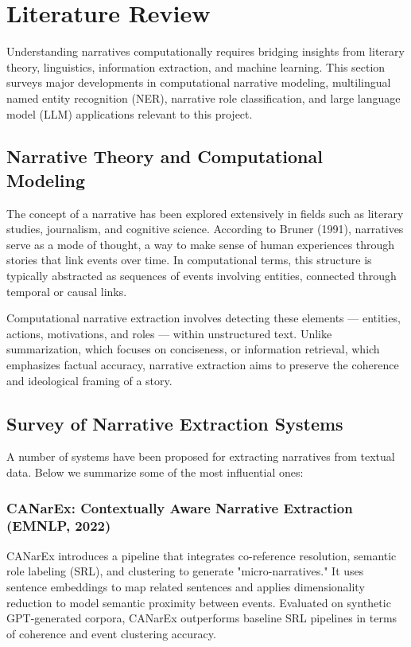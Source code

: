 \documentclass[12pt]{article}
\begin{document}
\section{Literature Review}

Understanding narratives computationally requires bridging insights from literary theory, linguistics, information extraction, and machine learning. This section surveys major developments in computational narrative modeling, multilingual named entity recognition (NER), narrative role classification, and large language model (LLM) applications relevant to this project.

\subsection{Narrative Theory and Computational Modeling}

The concept of a narrative has been explored extensively in fields such as literary studies, journalism, and cognitive science. According to Bruner (1991), narratives serve as a mode of thought, a way to make sense of human experiences through stories that link events over time. In computational terms, this structure is typically abstracted as sequences of events involving entities, connected through temporal or causal links.

Computational narrative extraction involves detecting these elements — entities, actions, motivations, and roles — within unstructured text. Unlike summarization, which focuses on conciseness, or information retrieval, which emphasizes factual accuracy, narrative extraction aims to preserve the coherence and ideological framing of a story.

\subsection{Survey of Narrative Extraction Systems}

A number of systems have been proposed for extracting narratives from textual data. Below we summarize some of the most influential ones:

\subsubsection{CANarEx: Contextually Aware Narrative Extraction (EMNLP, 2022)}

CANarEx introduces a pipeline that integrates co-reference resolution, semantic role labeling (SRL), and clustering to generate "micro-narratives." It uses sentence embeddings to map related sentences and applies dimensionality reduction to model semantic proximity between events. Evaluated on synthetic GPT-generated corpora, CANarEx outperforms baseline SRL pipelines in terms of coherence and event clustering accuracy.
\end{document}
